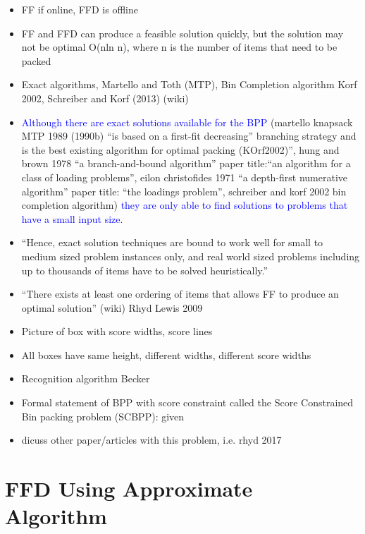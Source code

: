 \documentclass[oribibl]{llncs}
\begin{document}
\begin{itemize}
	\item FF if online, FFD is offline
	\item FF and FFD can produce a feasible solution quickly, but the solution may not be optimal O(nln n), where n is the number of items that need to be packed
	\item Exact algorithms, Martello and Toth (MTP), Bin Completion algorithm Korf 2002, Schreiber and Korf (2013) (wiki)
	\item \textcolor{blue}{Although there are exact solutions available for the BPP} (martello knapsack MTP 1989 (1990b) ``is based on a first-fit decreasing'' branching strategy and is the best existing algorithm for optimal packing (KOrf2002)'', hung and brown 1978 ``a branch-and-bound algorithm'' paper title:``an algorithm for a class of loading problems'', eilon christofides 1971 ``a depth-first numerative algorithm'' paper title: ``the loadings problem'', schreiber and korf 2002 bin completion algorithm) \textcolor{blue}{they are only able to find solutions to problems that have a small input size.}
	\item ``Hence, exact solution techniques are bound to work well for small to medium sized problem instances only, and real world sized problems including up to thousands of items have to be solved heuristically.''
	\item ``There exists at least one ordering of items that allows FF to produce an optimal solution'' (wiki) Rhyd Lewis 2009
	\item Picture of box with score widths, score lines
	\item All boxes have same height, different widths, different score widths
	\item Recognition algorithm Becker
	\item Formal statement of BPP with score constraint called the Score Constrained Bin packing problem (SCBPP): given
	\item dicuss other paper/articles with this problem, i.e. rhyd 2017
	
\end{itemize}


\section{FFD Using Approximate Algorithm}
\label{sec:ffdapprox}
\end{document}
